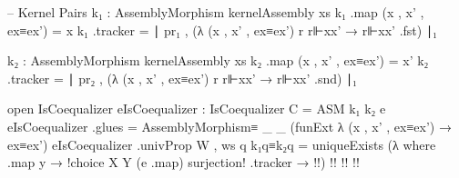         -- Kernel Pairs
        k₁ : AssemblyMorphism kernelAssembly xs
        k₁ .map (x , x' , ex≡ex') = x
        k₁ .tracker = ∣ pr₁ , (λ (x , x' , ex≡ex') r r⊩xx' → r⊩xx' .fst) ∣₁

        
        k₂ : AssemblyMorphism kernelAssembly xs
        k₂ .map (x , x' , ex≡ex') = x'
        k₂ .tracker = ∣ pr₂ , (λ (x , x' , ex≡ex') r r⊩xx' → r⊩xx' .snd) ∣₁

        open IsCoequalizer
        eIsCoequalizer : IsCoequalizer {C = ASM} k₁ k₂ e
        eIsCoequalizer .glues = AssemblyMorphism≡ _ _ (funExt λ (x , x' , ex≡ex') → ex≡ex')
        eIsCoequalizer .univProp {W , ws} q k₁q≡k₂q =
          uniqueExists
            (λ where
              .map y → {!choice X Y (e .map) surjection!}
              .tracker → {!!}) {!!} {!!} {!!}
